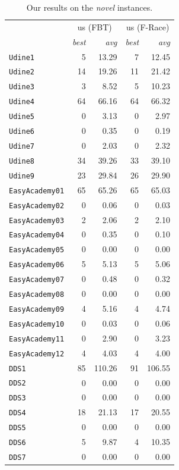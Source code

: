 \documentclass[authoryear,12pt]{article}
\begin{document}
{
    \renewcommand{\arraystretch}{1.1}
       \renewcommand{\tabcolsep}{14pt}

    \begin{table}[htdp]
    \caption{Our results on the \emph{novel} instances.}
    \begin{scriptsize}
    \begin{center}
    \begin{tabular}{l|rr|rr}

\toprule
                        & \multicolumn{2}{c|}{us (FBT)}& \multicolumn{2}{c}{us (F-Race)}       \\
                                & \emph{best} & \emph{avg}           & \emph{best} & \emph{avg}                           \\
\midrule
\texttt{Udine1} & 5 & 13.29 & 7 & 12.45 \\
\texttt{Udine2} & 14 & 19.26 & 11 & 21.42 \\
\texttt{Udine3} & 3 & 8.52 & 5 & 10.23 \\
\texttt{Udine4} & 64 & 66.16 & 64 & 66.32 \\
\texttt{Udine5} & 0 & 3.13 & 0 & 2.97 \\
\texttt{Udine6} & 0 & 0.35 & 0 & 0.19 \\
\texttt{Udine7} & 0 & 2.03 & 0 & 2.32 \\
\texttt{Udine8} & 34 & 39.26 & 33 & 39.10 \\
\texttt{Udine9} & 23 & 29.84 & 26 & 29.90 \\
\midrule
\texttt{EasyAcademy01} & 65 & 65.26 & 65 & 65.03 \\
\texttt{EasyAcademy02} & 0 & 0.06 & 0 & 0.03 \\
\texttt{EasyAcademy03} & 2 & 2.06 & 2 & 2.10 \\
\texttt{EasyAcademy04} & 0 & 0.35 & 0 & 0.10 \\
\texttt{EasyAcademy05} & 0 & 0.00 & 0 & 0.00 \\
\texttt{EasyAcademy06} & 5 & 5.13 & 5 & 5.06 \\
\texttt{EasyAcademy07} & 0 & 0.48 & 0 & 0.32 \\
\texttt{EasyAcademy08} & 0 & 0.00 & 0 & 0.00 \\
\texttt{EasyAcademy09} & 4 & 5.16 & 4 & 4.74 \\
\texttt{EasyAcademy10} & 0 & 0.03 & 0 & 0.06 \\
\texttt{EasyAcademy11} & 0 & 2.90 & 0 & 3.23 \\
\texttt{EasyAcademy12} & 4 & 4.03 & 4 & 4.00 \\
\midrule
\texttt{DDS1} & 85 & 110.26 & 91 & 106.55 \\
\texttt{DDS2} & 0 & 0.00 & 0 & 0.00 \\
\texttt{DDS3} & 0 & 0.00 & 0 & 0.00 \\
\texttt{DDS4} & 18 & 21.13 & 17 & 20.55 \\
\texttt{DDS5} & 0 & 0.00 & 0 & 0.00 \\
\texttt{DDS6} & 5 & 9.87 & 4 & 10.35 \\
\texttt{DDS7} & 0 & 0.00 & 0 & 0.00 \\
\bottomrule


\end{tabular}
\end{center}
\end{scriptsize}
\end{table}}
\end{document}
